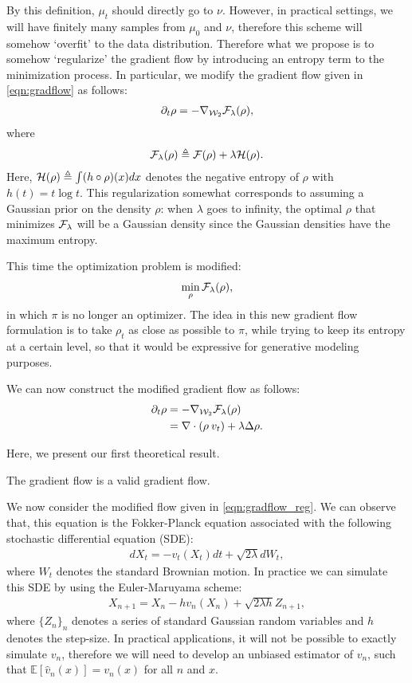 By this definition, $\mu_t$ should directly go to $\nu$. However, in practical settings, we will have finitely many samples from $\mu_0$ and $\nu$, therefore this scheme will somehow `overfit' to the data distribution. Therefore what we propose is to somehow `regularize' the gradient flow by introducing an entropy term to the minimization process. In particular, we modify the gradient flow given in \eqref{eqn:gradflow} as follows:
\begin{align}
\partial_t \rho = - \nabla_{{\cal W}_2} {\cal F}_\lambda(\rho),
\end{align}
where
\begin{align}
{\cal F}_\lambda(\rho) \triangleq {\cal F}(\rho) + \lambda {\cal H}(\rho).
\end{align}
Here, ${\cal H}(\rho) \triangleq \int (h \circ \rho) (x) dx $ denotes the negative entropy of $\rho$ with $h(t) = t \log t$. This regularization somewhat corresponds to assuming a Gaussian prior on the density $\rho$: when $\lambda$ goes to infinity, the optimal $\rho$ that minimizes ${\cal F}_\lambda$ will be a Gaussian density since the Gaussian densities have the maximum entropy.

This time the optimization problem is modified:
\begin{align}
\min_\rho {\cal F}_\lambda(\rho),
\end{align}
in which $\pi$ is no longer an optimizer. The idea in this new gradient flow formulation is to take $\rho_t$ as close as possible to $\pi$, while trying to keep its entropy at a certain level, so that it would be expressive for generative modeling purposes.

We can now construct the modified gradient flow as follows:
\begin{align}
\partial_t \rho &= - \nabla_{{\cal W}_2} {\cal F}_\lambda(\rho) \\
&=  \nabla \cdot (\rho \> v_t) + \lambda \Delta \rho. \label{eqn:gradflow_reg}
\end{align}

Here, we present our first theoretical result. 
\begin{thm}
The gradient flow is a valid gradient flow. 
\end{thm}

We now consider the modified flow given in \eqref{eqn:gradflow_reg}. We can observe that, this equation is the Fokker-Planck equation associated with the following stochastic differential equation (SDE):
\begin{align}
d X_t = - v_t(X_t) dt + \sqrt{2 \lambda } d W_t, \label{eqn:sde}
\end{align}
where $W_t$ denotes the standard Brownian motion. In practice we can simulate this SDE by using the Euler-Maruyama scheme:
\begin{align}
X_{n+1} = X_n - h v_n(X_n) + \sqrt{2 \lambda h} Z_{n+1},
\end{align}
where $\{Z_n\}_{n}$ denotes a series of standard Gaussian random variables and $h$ denotes the step-size. In practical applications, it will not be possible to exactly simulate $v_n$, therefore we will need to develop an unbiased estimator of $v_n$, such that $\mathbb{E}[\hat{v}_n (x)] = v_n(x)$ for all $n$ and $x$. 


